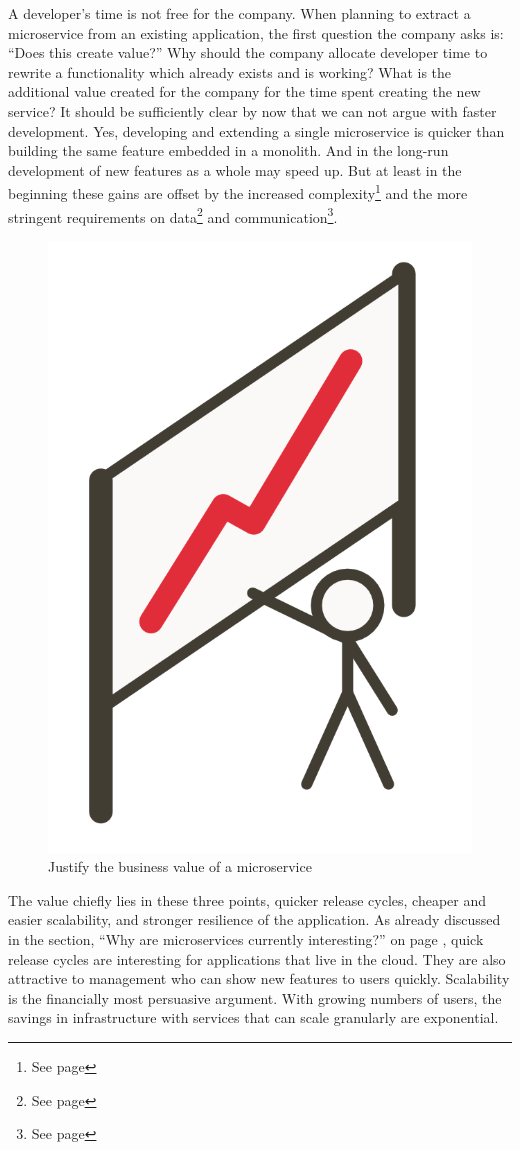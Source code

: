 A developer's time is not free for the company. When planning to extract a microservice from an existing application, the first question the company asks is: ``Does this create value?'' Why should the company allocate developer time to rewrite a functionality which already exists and is working? What is the additional value created for the company for the time spent creating the new service? It should be sufficiently clear by now that we can not argue with faster development. Yes, developing and extending a single microservice is quicker than building the same feature embedded in a monolith. And in the long-run development of new features as a whole may speed up. But at least in the beginning these gains are offset by the increased complexity\footnote{See page \pageref{sec:theory:challenges:ops}} and the more stringent requirements on data\footnote{See page \pageref{sec:theory:challenges:data}} and communication\footnote{See page \pageref{sec:theory:challenges:communication}}.

\begin{figure}[ht]
  \centering
  \includegraphics[width=0.3\linewidth]{assets/illustration-business-values.png}
  \caption{Justify the business value of a microservice}
\end{figure}

The value chiefly lies in these three points, quicker release cycles, cheaper and easier scalability, and stronger resilience of the application. As already discussed in the section, ``Why are microservices currently interesting?'' on page \pageref{sec:theory:interesting}, quick release cycles are interesting for applications that live in the cloud. They are also attractive to management who can show new features to users quickly. Scalability is the financially most persuasive argument. With growing numbers of users, the savings in infrastructure with services that can scale granularly are exponential.

